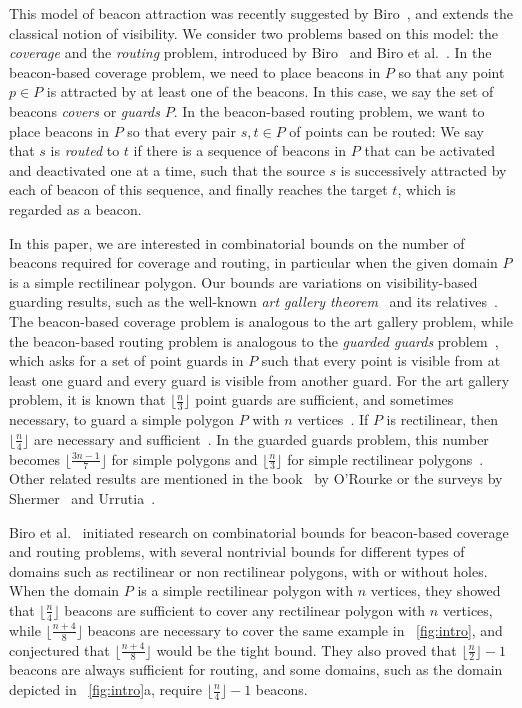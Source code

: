 \documentclass[11pt]{article}
\theoremstyle{definition}
\begin{document}
This model of beacon attraction was recently suggested by 
Biro~\cite{b-bbrg-13, bgikm-cccg-13, bikm-wads-13},
and extends the classical notion of visibility.
We consider two problems based on this model:
the \emph{coverage} and the \emph{routing} problem,
introduced by Biro~\cite{b-bbrg-13} and Biro et al.~\cite{bgikm-cccg-13,bikm-wads-13}.
In the beacon-based coverage problem, we need to place beacons in $P$
so that any point $p\in P$ is attracted by at least one of the beacons.
In this case, we say the set of beacons \emph{covers} or \emph{guards} $P$.
In the beacon-based routing problem, we want to place beacons in $P$
so that every pair $s, t\in P$ of points can be routed:
We say that $s$ is  \emph{routed} to $t$ if there is a sequence of beacons in $P$
that can be activated and deactivated one at a time,
such that the source $s$ is successively attracted by each of beacon of this sequence,
and finally reaches the target $t$, which is regarded as a beacon.

In this paper, we are interested in combinatorial bounds
on the number of beacons required for coverage and routing,
in particular when the given domain $P$ is a simple rectilinear polygon.
Our bounds are variations on visibility-based guarding results, such
as the well-known \emph{art gallery theorem}~\cite{c-ctpg-75} and
its relatives~\cite{o-apragt-83,ghks-ggprp-96, kkk-tgrfw-83, g-spragt-86, mp-agtgg-03}.
The beacon-based coverage problem is analogous to the art gallery problem,
while the beacon-based routing problem is analogous to the \emph{guarded guards} 
problem~\cite{mp-agtgg-03}, 
which asks for a set of point guards in $P$ such that every point is visible from
at least one guard and every guard is visible from another guard.
For the art gallery problem, it is known that
$\lfloor \frac{n}{3} \rfloor$ point guards are sufficient, and sometimes necessary,
to guard a simple polygon $P$ with $n$ vertices~\cite{c-ctpg-75}.
If $P$ is rectilinear, then $\lfloor \frac{n}{4} \rfloor$ are necessary and 
sufficient~\cite{kkk-tgrfw-83,o-agta-87, g-spragt-86}.
In the guarded guards problem, this number
becomes $\lfloor \frac{3n-1}{7} \rfloor$ for simple polygons
and $\lfloor \frac{n}{3} \rfloor$ for simple rectilinear polygons~\cite{mp-agtgg-03}.
Other related results are mentioned in the book~\cite{o-agta-87} by O'Rourke
or the surveys by Shermer~\cite{s-rrag-92} and Urrutia~\cite{u-agip-00}.

Biro et al.~\cite{bgikm-cccg-13} initiated research on combinatorial bounds
for beacon-based coverage and routing problems,
with several nontrivial bounds for different types of domains such as
rectilinear or non rectilinear polygons, with or without holes.
When the domain $P$ is a simple rectilinear polygon with $n$ vertices, they showed that $\lfloor \frac{n}{4} \rfloor$ beacons are sufficient to cover
any rectilinear polygon with $n$ vertices,
while $\lfloor \frac{n+4}{8} \rfloor$ beacons are necessary to cover
the same example in \figurename~\ref{fig:intro},
and conjectured that $\lfloor \frac{n+4}{8} \rfloor$ would be the tight bound.
They also proved that $\lfloor \frac{n}{2} \rfloor -1$ beacons are always sufficient for routing, and some domains, such as the domain depicted in \figurename~\ref{fig:intro}a, require $\lfloor \frac{n}{4} \rfloor - 1$ beacons.
\end{document}
